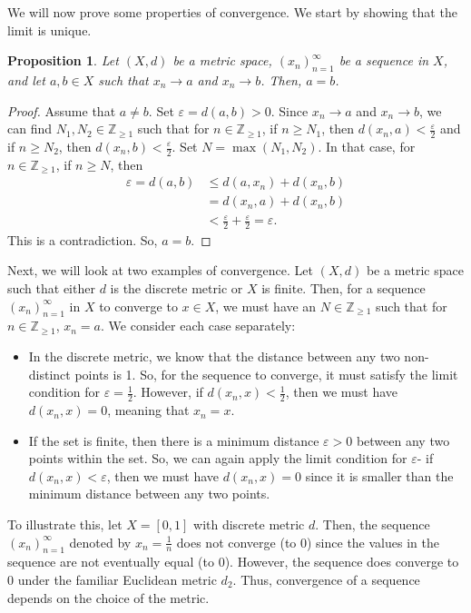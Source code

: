 \documentclass[a4paper, openany]{memoir}
\theoremstyle{definition}
\theoremstyle{plain}
\newtheorem{proposition}[definition]{Proposition}
\begin{document}
We will now prove some properties of convergence. We start by showing that the limit is unique.
\begin{proposition}
Let $(X, d)$ be a metric space, $(x_n)_{n=1}^{\infty}$ be a sequence in $X$, and let $a, b \in X$ such that $x_n \to a$ and $x_n \to b$. Then, $a = b$.
\end{proposition}
\begin{proof}
Assume that $a \neq b$. Set $\varepsilon = d(a, b) > 0$. Since $x_n \to a$ and $x_n \to b$, we can find $N_1, N_2 \in \mathbb{Z}_{\geqslant 1}$ such that for $n \in \mathbb{Z}_{\geqslant 1}$, if $n \geqslant N_1$, then $d(x_n, a) < \frac{\varepsilon}{2}$ and if $n \geqslant N_2$, then $d(x_n, b) < \frac{\varepsilon}{2}$. Set $N = \max(N_1, N_2)$. In that case, for $n \in \mathbb{Z}_{\geqslant 1}$, if $n \geqslant N$, then
\begin{align*}
    \varepsilon = d(a, b) &\leqslant d(a, x_n) + d(x_n, b) \\
    &= d(x_n, a) + d(x_n, b) \\
    &< \frac{\varepsilon}{2} + \frac{\varepsilon}{2} = \varepsilon.
\end{align*}
This is a contradiction. So, $a = b$.
\end{proof}

Next, we will look at two examples of convergence. Let $(X, d)$ be a metric space such that either $d$ is the discrete metric or $X$ is finite. Then, for a sequence $(x_n)_{n=1}^{\infty}$ in $X$ to converge to $x \in X$, we must have an $N \in \mathbb{Z}_{\geqslant 1}$ such that for $n \in \mathbb{Z}_{\geqslant 1}$, $x_n = a$. We consider each case separately:
\begin{itemize}
    \item In the discrete metric, we know that the distance between any two non-distinct points is 1. So, for the sequence to converge, it must satisfy the limit condition for $\varepsilon = \frac{1}{2}$. However, if $d(x_n, x) < \frac{1}{2}$, then we must have $d(x_n, x) = 0$, meaning that $x_n = x$.
    
    \item If the set is finite, then there is a minimum distance $\varepsilon > 0$ between any two points within the set. So, we can again apply the limit condition for $\varepsilon$- if $d(x_n, x) < \varepsilon$, then we must have $d(x_n, x) = 0$ since it is smaller than the minimum distance between any two points.
\end{itemize}
\noindent To illustrate this, let $X = [0, 1]$ with discrete metric $d$. Then, the sequence $(x_n)_{n=1}^{\infty}$ denoted by $x_n = \frac{1}{n}$ does not converge (to 0) since the values in the sequence are not eventually equal (to 0). However, the sequence does converge to 0 under the familiar Euclidean metric $d_2$. Thus, convergence of a sequence depends on the choice of the metric.
\end{document}
